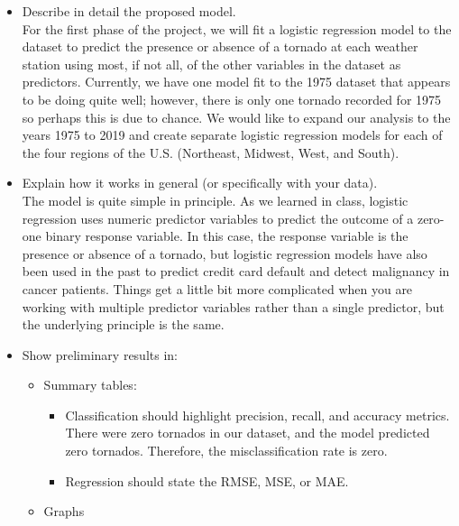\documentclass[conference]{IEEEtran}
\begin{document}
\begin{itemize}
  \item Describe in detail the proposed model. \\

  For the first phase of the project, we will fit a logistic regression model to the dataset to predict the presence or absence of a tornado at each weather station using most, if not all, of the other variables in the dataset as predictors. Currently, we have one model fit to the 1975 dataset that appears to be doing quite well; however, there is only one tornado recorded for 1975 so perhaps this is due to chance. We would like to expand our analysis to the years 1975 to 2019 and create separate logistic regression models for each of the four regions of the U.S. (Northeast, Midwest, West, and South). \\

  \item Explain how it works in general (or specifically with your data). \\

  The model is quite simple in principle. As we learned in class, logistic regression uses numeric predictor variables to predict the outcome of a zero-one binary response variable. In this case, the response variable is the presence or absence of a tornado, but logistic regression  models have also been used in the past to predict credit card default and detect malignancy in cancer patients. Things get a little bit more complicated when you are working with multiple predictor variables rather than a single predictor, but the underlying principle is the same. \\

  \item Show preliminary results in:
  \begin{itemize}
    \item Summary tables:
    \begin{itemize}
      \item Classification should highlight precision, recall, and accuracy metrics. \\

      There were zero tornados in our dataset, and the model predicted zero tornados. Therefore, the misclassification rate is zero. \\

      \item Regression should state the RMSE, MSE, or MAE.
    \end{itemize}
    \item Graphs


\end{itemize}
\end{itemize}
\end{document}
